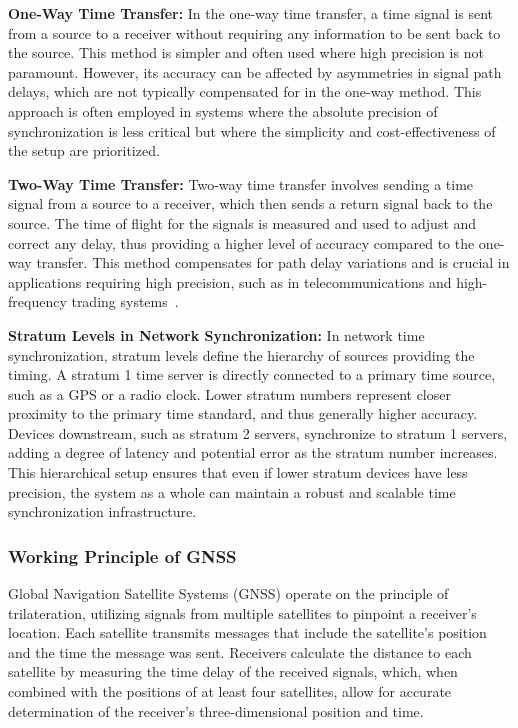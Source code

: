 \documentclass[12pt, a4paper]{extarticle}
\begin{document}
\textbf{One-Way Time Transfer:} In the one-way time transfer, a time signal is sent
from a source to a receiver without requiring any information to be sent back
to the source. This method is simpler and often used where high precision is
not paramount. However, its accuracy can be affected by asymmetries in signal
path delays, which are not typically compensated for in the one-way method.
This approach is often employed in systems where the absolute precision of
synchronization is less critical but where the simplicity and
cost-effectiveness of the setup are prioritized.

\textbf{Two-Way Time Transfer:} Two-way time transfer involves sending a time
signal from a source to a receiver, which then sends a return signal back to
the source. The time of flight for the signals is measured and used to adjust
and correct any delay, thus providing a higher level of accuracy compared to
the one-way transfer. This method compensates for path delay variations and is
crucial in applications requiring high precision, such as in telecommunications
and high-frequency trading systems~\cite{two-way-time-transfer}.

\textbf{Stratum Levels in Network Synchronization:} In network time
synchronization, stratum levels define the hierarchy of sources providing the
timing. A stratum 1 time server is directly connected to a primary time source,
such as a GPS or a radio clock. Lower stratum numbers represent closer
proximity to the primary time standard, and thus generally higher accuracy.
Devices downstream, such as stratum 2 servers, synchronize to stratum 1
servers, adding a degree of latency and potential error as the stratum number
increases. This hierarchical setup ensures that even if lower stratum devices
have less precision, the system as a whole can maintain a robust and scalable
time synchronization infrastructure.

\subsubsection{Working Principle of GNSS}

Global Navigation Satellite Systems (GNSS) operate on the principle of
trilateration, utilizing signals from multiple satellites to pinpoint a
receiver's location. Each satellite transmits messages that include the
satellite's position and the time the message was sent. Receivers calculate the
distance to each satellite by measuring the time delay of the received signals,
which, when combined with the positions of at least four satellites, allow for
accurate determination of the receiver's three-dimensional position and time.
\end{document}
